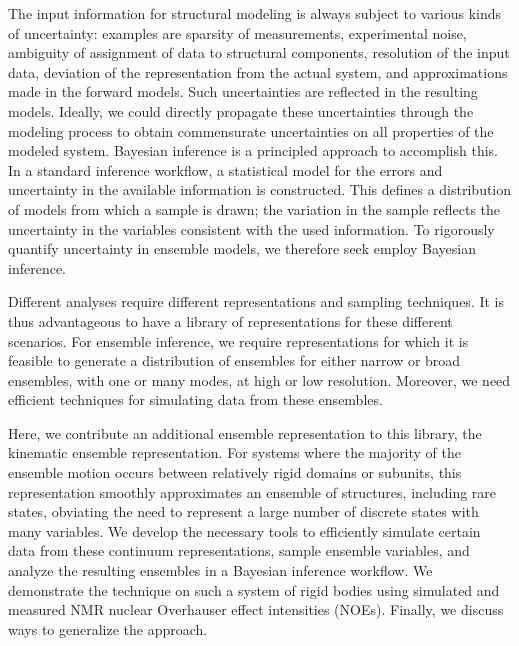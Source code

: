 \documentclass[../../main.tex]{subfiles}
\begin{document}
\begin{refsection}
	The input information for structural modeling is always subject to various kinds of uncertainty\supercite{schneidman-duhovnyUncertaintyIntegrativeStructural2014}: examples are sparsity of measurements, experimental noise, ambiguity of assignment of data to structural components, resolution of the input data, deviation of the representation from the actual system, and approximations made in the forward models.
	Such uncertainties are reflected in the resulting models.
	Ideally, we could directly propagate these uncertainties through the modeling process to obtain commensurate uncertainties on all properties of the modeled system.
	Bayesian inference is a principled approach to accomplish this.
	In a standard inference workflow, a statistical model for the errors and uncertainty in the available information is constructed.
	This defines a distribution of models from which a sample is drawn; the variation in the sample reflects the uncertainty in the variables consistent with the used information.
	To rigorously quantify uncertainty in ensemble models, we therefore seek employ Bayesian inference.


	Different analyses require different representations and sampling techniques.
	It is thus advantageous to have a library of representations for these different scenarios.
	For ensemble inference, we require representations for which it is feasible to generate a distribution of ensembles for either narrow or broad ensembles, with one or many modes, at high or low resolution.
	Moreover, we need efficient techniques for simulating data from these ensembles.


	Here, we contribute an additional ensemble representation to this library, the kinematic ensemble representation.
	For systems where the majority of the ensemble motion occurs between relatively rigid domains or subunits, this representation smoothly approximates an ensemble of structures, including rare states, obviating the need to represent a large number of discrete states with many variables.
	We develop the necessary tools to efficiently simulate certain data from these continuum representations, sample ensemble variables, and analyze the resulting ensembles in a Bayesian inference workflow.
	We demonstrate the technique on such a system of rigid bodies using simulated and measured NMR nuclear Overhauser effect intensities (NOEs).
	Finally, we discuss ways to generalize the approach.


\end{refsection}
\end{document}
